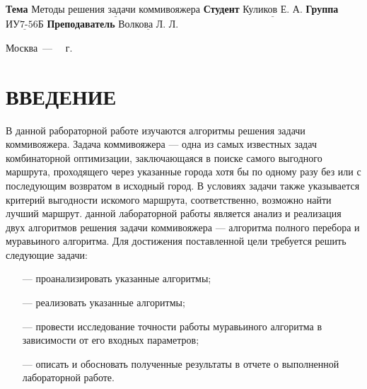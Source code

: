 \documentclass{bmstu}
\begin{document}
\begin{titlepage}
	\noindent\textbf{Тема} 			$\underline{\text{Методы решения задачи коммивояжера}}$\newline\newline
	\noindent\textbf{Студент} 		$\underline{\text{Куликов Е. А.}}$\newline\newline
	\noindent\textbf{Группа} 		$\underline{\text{ИУ7-56Б}}$\newline\newline
	\noindent\textbf{Преподаватель} $\underline{\text{Волкова Л. Л.}}$\newline

	\begin{center}
		\vfill
		Москва~---~\the\year
		~г.
	\end{center}
	\restoregeometry
\end{titlepage}

\renewcommand{\contentsname}{СОДЕРЖАНИЕ}
\tableofcontents
\setcounter{page}{2}

\chapter*{ВВЕДЕНИЕ}

В данной рабораторной работе изучаются алгоритмы решения задачи коммивояжера.
Задача коммивояжера --- одна из самых известных задач комбинаторной оптимизации, заключающаяся в поиске самого выгодного маршрута, проходящего через указанные города хотя бы по одному разу без или с последующим возвратом в исходный город. В условиях задачи также указывается критерий выгодности искомого маршрута, соответственно, возможно найти лучший маршрут.
 данной лабораторной работы является анализ и реализация двух алгоритмов решения задачи коммивояжера --- алгоритма полного перебора и муравьиного алгоритма. Для достижения поставленной цели требуется решить следующие задачи:

\begin{itemize}
	\item[---] проанализировать указанные алгоритмы;
	\item[---] реализовать указанные алгоритмы;
	\item[---] провести исследование точности работы муравьиного алгоритма в зависимости от его входных параметров;
    \item[---] описать и обосновать полученные результаты в отчете о выполненной лабораторной работе.
\end{itemize}
\end{document}
